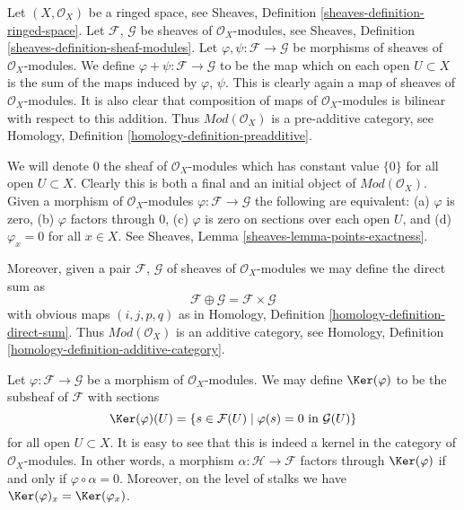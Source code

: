 \noindent
Let $(X, \mathcal{O}_X)$ be a ringed space, see
Sheaves, Definition \ref{sheaves-definition-ringed-space}.
Let $\mathcal{F}$, $\mathcal{G}$ be sheaves of $\mathcal{O}_X$-modules, see
Sheaves, Definition \ref{sheaves-definition-sheaf-modules}.
Let $\varphi, \psi : \mathcal{F} \to \mathcal{G}$
be morphisms of sheaves of $\mathcal{O}_X$-modules.
We define $\varphi + \psi : \mathcal{F} \to \mathcal{G}$
to be the map which on each open $U \subset X$ is the
sum of the maps induced by $\varphi$, $\psi$. This is
clearly again a map of sheaves of $\mathcal{O}_X$-modules.
It is also clear that composition of maps of
$\mathcal{O}_X$-modules is bilinear with respect to this
addition. Thus $\textit{Mod}(\mathcal{O}_X)$ is a pre-additive
category, see Homology, Definition \ref{homology-definition-preadditive}.

\medskip\noindent
We will denote $0$ the sheaf of $\mathcal{O}_X$-modules
which has constant value $\{0\}$ for all open $U \subset X$.
Clearly this is both a final and an initial object of
$\textit{Mod}(\mathcal{O}_X)$. Given a morphism
of $\mathcal{O}_X$-modules $\varphi : \mathcal{F} \to \mathcal{G}$
the following are equivalent:
(a) $\varphi$ is zero, (b) $\varphi$ factors through $0$,
(c) $\varphi$ is zero on sections over each open $U$, and
(d) $\varphi_x = 0$ for all $x \in X$. See
Sheaves, Lemma \ref{sheaves-lemma-points-exactness}.

\medskip\noindent
Moreover, given a pair
$\mathcal{F}$, $\mathcal{G}$ of sheaves of $\mathcal{O}_X$-modules
we may define the direct sum as
$$
\mathcal{F} \oplus \mathcal{G} = \mathcal{F} \times \mathcal{G}
$$
with obvious maps $(i, j, p, q)$ as in Homology, Definition
\ref{homology-definition-direct-sum}. Thus $\textit{Mod}(\mathcal{O}_X)$
is an additive category, see
Homology, Definition \ref{homology-definition-additive-category}.

\medskip\noindent
Let $\varphi : \mathcal{F} \to \mathcal{G}$ be a morphism
of $\mathcal{O}_X$-modules. We may define $\Ker(\varphi)$
to be the subsheaf of $\mathcal{F}$ with sections
$$
\Ker(\varphi)(U) =
\{ s \in \mathcal{F}(U) \mid \varphi(s) = 0 \text{ in } \mathcal{G}(U)\}
$$
for all open $U \subset X$. It is easy to see that this is indeed
a kernel in the category of $\mathcal{O}_X$-modules. In other words,
a morphism $\alpha : \mathcal{H} \to \mathcal{F}$ factors
through $\Ker(\varphi)$ if and only if $\varphi \circ \alpha = 0$.
Moreover, on the level of stalks we have
$\Ker(\varphi)_x = \Ker(\varphi_x)$.

